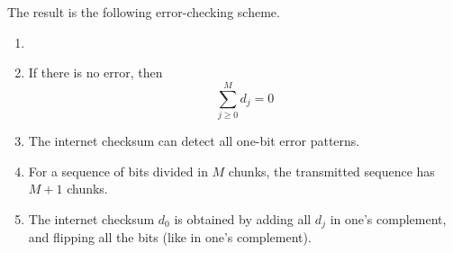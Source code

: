 \documentclass[../../main.tex]{subfiles}
\begin{document}
    The result is the following error-checking scheme.
\begin{wtr}
\begin{enumerate}
        \item[]
        \item If there is no error, then
        \[
        \boxed{\sum_{j\geq 0}^M d_j=0}
        \]
        \item The internet checksum can detect all one-bit error patterns.
        \item For a sequence of bits divided in $M$ chunks, the transmitted sequence has $M+1$ chunks.
        \item The internet checksum $d_0$ is obtained by adding all $d_j$ in one's complement, and flipping all the bits (like in one's complement).
    \end{enumerate}
\end{wtr}    
\end{document}
